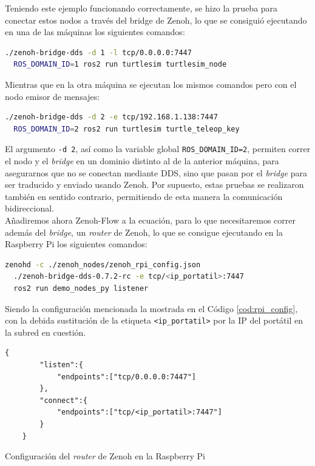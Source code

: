 Teniendo este ejemplo funcionando correctamente, se hizo la prueba para conectar
estos nodos a través del bridge de Zenoh, lo que se consiguió ejecutando en una
de las máquinas los siguientes comandos:
\begin{lstlisting}[language=bash]
  ./zenoh-bridge-dds -d 1 -l tcp/0.0.0.0:7447
  ROS_DOMAIN_ID=1 ros2 run turtlesim turtlesim_node
\end{lstlisting}

Mientras que en la otra máquina se ejecutan los mismos comandos pero con el nodo
emisor de mensajes:
\begin{lstlisting}[language=bash]
  ./zenoh-bridge-dds -d 2 -e tcp/192.168.1.138:7447
  ROS_DOMAIN_ID=2 ros2 run turtlesim turtle_teleop_key
\end{lstlisting}

El argumento \verb|-d 2|, así como la variable global \verb|ROS_DOMAIN_ID=2|,
permiten correr el nodo y el \textit{bridge} en un dominio distinto al de la
anterior máquina, para asegurarnos que no se conectan mediante DDS, sino que
pasan por el \textit{bridge} para ser traducido y enviado usando Zenoh.
Por supuesto, estas pruebas se realizaron también en sentido contrario,
permitiendo de esta manera la comunicación bidireccional.
\\

Añadiremos ahora Zenoh-Flow a la ecuación, para lo que necesitaremos correr
además del \textit{bridge}, un \textit{router} de Zenoh, lo que se consigue
ejecutando en la Raspberry Pi los siguientes comandos:
\begin{lstlisting}[language=bash]
  zenohd -c ./zenoh_nodes/zenoh_rpi_config.json
  ./zenoh-bridge-dds-0.7.2-rc -e tcp/<ip_portatil>:7447
  ros2 run demo_nodes_py listener
\end{lstlisting}

Siendo la configuración mencionada la mostrada en el Código
\ref{cod:rpi_config}, con la debida sustitución de la etiqueta
\verb|<ip_portatil>| por la IP del portátil en la subred en cuestión.
\\

\begin{code}[h!]
  \begin{lstlisting}[style=json]
    {
        "listen":{
            "endpoints":["tcp/0.0.0.0:7447"]
        },
        "connect":{
            "endpoints":["tcp/<ip_portatil>:7447"]
        }
    }
  \end{lstlisting}
\caption[Configuración del \textit{router} de Zenoh en la Raspberry Pi]{Configuración del \textit{router} de Zenoh en la Raspberry Pi}
\label{cod:rpi_config}
\end{code}


